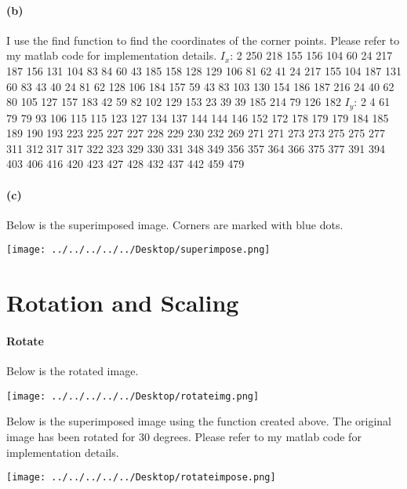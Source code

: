 \documentclass[11pt, oneside]{article}   	%
\begin{document}
\paragraph{(b)} I use the find function to find the coordinates of the corner points. Please refer to my matlab code for implementation details. \newline
\newline
$I_{x}$: 2
250
218
155
156
104
60
24
217
187
156
131
104
83
84
60
43
185
158
128
129
106
81
62
41
24
217
155
104
187
131
60
83
43
40
24
81
62
128
106
184
157
59
43
83
103
130
154
186
187
216
24
40
62
80
105
127
157
183
42
59
82
102
129
153
23
39
39
185
214
79
126
182 \newline
\newline
$I_{y}$: 2
4
61
79
79
93
106
115
115
123
127
134
137
144
144
146
152
172
178
179
179
184
185
189
190
193
223
225
227
227
228
229
230
232
269
271
271
273
273
275
275
277
311
312
317
317
322
323
329
330
331
348
349
356
357
364
366
375
377
391
394
403
406
416
420
423
427
428
432
437
442
459
479

\paragraph{(c)} Below is the superimposed image. Corners are marked with blue dots. \newline\newline
\begin{center}
\texttt{[image: ../../../../../Desktop/superimpose.png]}
\end{center}
\section{Rotation and Scaling}
\paragraph{Rotate} Below is the rotated image.\newline\newline
\begin{center}
\texttt{[image: ../../../../../Desktop/rotateimg.png]}
\end{center}
Below is the superimposed image using the function created above. The original image has been rotated for 30 degrees. Please refer to my matlab code for implementation details.
\newline\newline
\begin{center}
\texttt{[image: ../../../../../Desktop/rotateimpose.png]}
\end{center}
\end{document}
